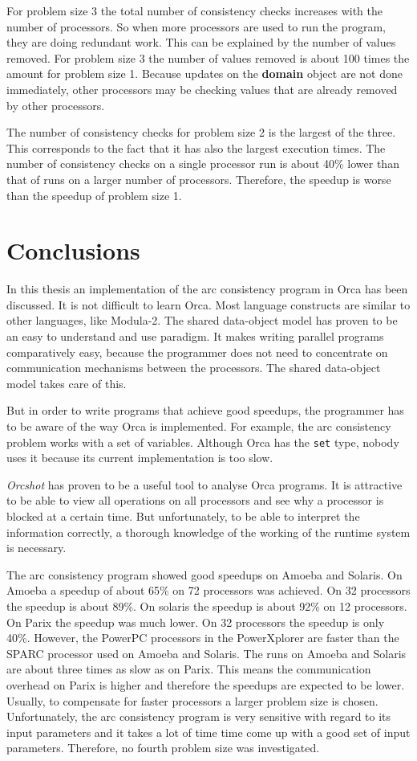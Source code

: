 \documentclass[a4paper,11pt]{article}
\begin{document}
For problem size 3 the total number of consistency checks
increases with the number of 
processors. So when more processors are used to run the program, they
are doing redundant work. This can be explained by the number of values
removed. For problem size 3 the number of values removed is about
100 times the
amount for problem size 1. Because updates on the {\bf domain} object are not
done immediately, other processors may be checking values that are
already removed by other processors.

The number of consistency checks for problem size 2 is the largest of the
three. This corresponds to the fact that it has also the largest
execution times. The number of consistency checks on a single
processor run is about 40\% lower than that of runs on a larger number of
processors. Therefore, the speedup is worse than the speedup of problem
size 1.

\section{Conclusions}
\label{sec:discussion}
In this thesis an implementation of the arc consistency program in Orca
has been discussed. It is not difficult to learn Orca. Most language
constructs are similar to other languages, like Modula-2. The shared
data-object model has proven to be an easy to understand and use paradigm.
It makes writing parallel programs comparatively easy, because the
programmer does not need to concentrate on communication mechanisms
between the processors. The shared data-object model takes care of this.

But in order to write programs that achieve good speedups, the programmer
has to be aware of the way Orca is implemented. For example, the arc
consistency problem works with a set of variables. Although Orca has
the {\tt set} type, nobody uses it because its current implementation
is too slow.

{\em Orcshot} has proven to be a useful tool to analyse Orca programs.
It is attractive to be able to view all operations on all
processors and see why a processor is blocked at a certain time.
But unfortunately, to be able to interpret the information correctly,
a thorough knowledge of the working of the runtime system is necessary.

The arc consistency program showed good speedups on Amoeba and Solaris.
On Amoeba a speedup of about 65\% on 72 processors was achieved. On 32
processors the speedup is about 89\%. On solaris the speedup is about
92\% on 12 processors. On Parix the speedup was much lower. On 32
processors the speedup is only 40\%.
However, the PowerPC processors in the PowerXplorer are faster than the
SPARC processor used on Amoeba and Solaris. The runs on Amoeba and
Solaris are about three times as slow as on Parix.
This means the communication overhead on Parix is higher and therefore
the speedups are expected to be lower.
Usually, to compensate for faster processors a larger problem size is chosen.
Unfortunately, the arc consistency program is very sensitive
with regard to its input parameters and it takes a lot of time time come
up with a good set of input parameters. Therefore, no fourth problem
size was investigated.
\end{document}
